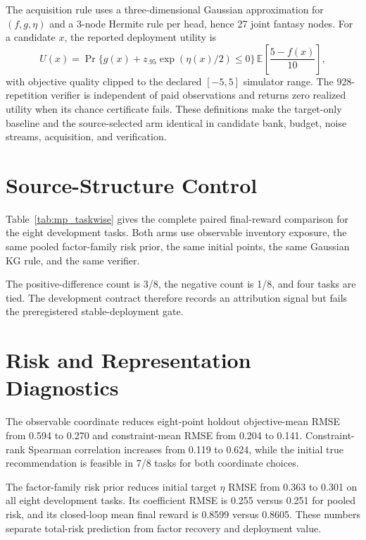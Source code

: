 \documentclass[opre,dblanonrev]{informs4}
\begin{document}
The acquisition rule uses a three-dimensional Gaussian approximation for
$(f,g,\eta)$ and a 3-node Hermite rule per head, hence 27 joint fantasy nodes.
For a candidate $x$, the reported deployment utility is
\[
U(x)=\Pr\{g(x)+z_{.95}\exp(\eta(x)/2)\le 0\}\,
\mathbb{E}\left[\frac{5-f(x)}{10}\right],
\]
with objective quality clipped to the declared $[-5,5]$ simulator range.  The
928-repetition verifier is independent of paid observations and returns zero
realized utility when its chance certificate fails.  These definitions make the
target-only baseline and the source-selected arm identical in candidate bank,
budget, noise streams, acquisition, and verification.

\section{Source-Structure Control}

Table~\ref{tab:mp_taskwise} gives the complete paired final-reward comparison
for the eight development tasks.  Both arms use observable inventory exposure,
the same pooled factor-family risk prior, the same initial points, the same
Gaussian KG rule, and the same verifier.

\begin{table}[h]
\centering
\caption{Taskwise source-selected structure minus same-source full dictionary.}
\label{tab:mp_taskwise}

\end{table}

The positive-difference count is 3/8, the negative count is 1/8, and four
tasks are tied.  The development contract therefore records an attribution
signal but fails the preregistered stable-deployment gate.

\section{Risk and Representation Diagnostics}

The observable coordinate reduces eight-point holdout objective-mean RMSE from
0.594 to 0.270 and constraint-mean RMSE from 0.204 to 0.141.  Constraint-rank
Spearman correlation increases from 0.119 to 0.624, while the initial true
recommendation is feasible in 7/8 tasks for both coordinate choices.

The factor-family risk prior reduces initial target $\eta$ RMSE from 0.363 to
0.301 on all eight development tasks.  Its coefficient RMSE is 0.255 versus
0.251 for pooled risk, and its closed-loop mean final reward is 0.8599 versus
0.8605.  These numbers separate total-risk prediction from factor recovery and
 deployment value.
\end{document}
